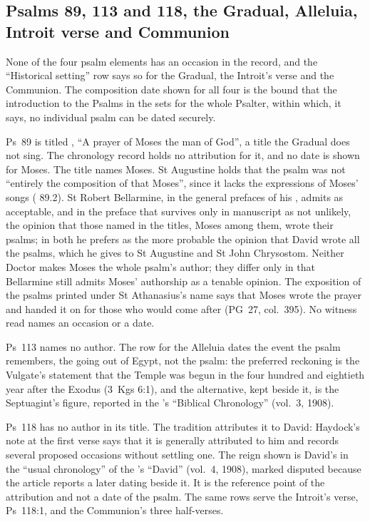 \subsection{Psalms 89, 113 and 118, the Gradual, Alleluia, Introit verse and Communion}
\label{sec:date-psalms}

None of the four psalm elements has an occasion in the record, and the
``Historical setting'' row says so for the Gradual, the Introit's verse and the
Communion. The composition date shown for all four is the bound that the
introduction to the Psalms in the  sets for
the whole Psalter, within which, it says, no individual psalm can be dated
securely.

Ps~89 is titled , ``A prayer of Moses the man of
God'', a title the Gradual does not sing. The chronology record holds no
attribution for it, and no date is shown for Moses. The title names Moses. St
Augustine holds that the psalm was not ``entirely the composition of that Moses'',
since it lacks the expressions of Moses' songs ( 89.2). St Robert
Bellarmine, in the general prefaces of his , admits
as acceptable, and in the preface that survives only in manuscript as not unlikely,
the opinion that those named in the titles, Moses among them, wrote their psalms;
in both he prefers as the more probable the opinion that David wrote all the
psalms, which he gives to St Augustine and St John Chrysostom. Neither Doctor
makes Moses the whole psalm's author; they differ only in that Bellarmine still
admits Moses' authorship as a tenable opinion. The exposition of the psalms printed under
St Athanasius's name says that Moses wrote the prayer and handed it on for those
who would come after (PG~27, col.~395). No witness read names an occasion or a
date.

Ps~113 names no author. The row for the Alleluia dates the event the psalm
remembers, the going out of Egypt, not the psalm: the preferred reckoning is the
Vulgate's statement that the Temple was begun in the four hundred and eightieth
year after the Exodus (3~Kgs 6:1), and the alternative, kept beside it, is the
Septuagint's figure, reported in the 's ``Biblical
Chronology'' (vol.~3, 1908).

Ps~118 has no author in its title. The tradition attributes it to David: Haydock's
note at the first verse says that it is generally attributed to him and records
several proposed occasions without settling one. The reign shown is David's in the
``usual chronology'' of the 's ``David'' (vol.~4, 1908),
marked disputed because the article reports a later dating beside it. It is the
reference point of the attribution and not a date of the psalm. The same rows serve
the Introit's verse, Ps~118:1, and the Communion's three half-verses.

